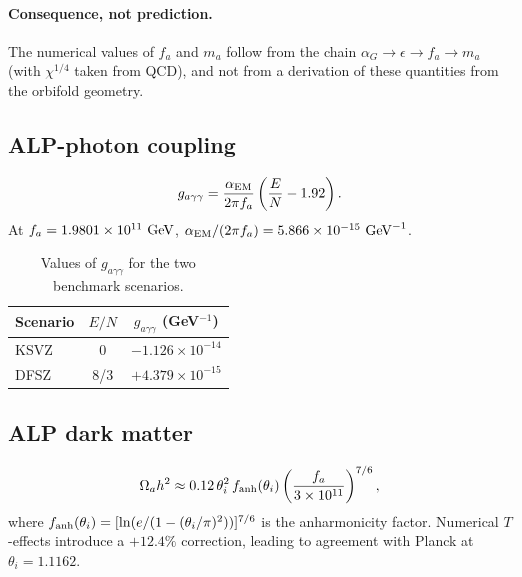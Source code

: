 \documentclass[12pt,a4paper]{article}
\numberwithin{equation}{section}
\begin{document}
\paragraph{Consequence, not prediction.}
The numerical values of \(f_a\) and \(m_a\) follow from the chain \(\alpha_G\to \epsilon \to f_a\to m_a\) (with \(\chi^{1/4}\) taken from QCD), and not from a derivation of these quantities from the orbifold geometry.

\subsection{ALP-photon coupling}
\begin{equation}
g_{a\gamma\gamma} = \frac{\alpha_{\rm EM}}{2\pi f_a}\left(\frac{E}{N} -1.92\right).
\end{equation}
At \(f_a = 1.9801\times 10^{11}~{\rm GeV}\), \(\alpha_{\rm EM}/(2\pi f_a) = 5.866\times 10^{-15}~{\rm GeV}^{-1}\).

\begin{table}[H]
\centering
\caption{Values of \(g_{a\gamma\gamma}\) for the two benchmark scenarios.}
\begin{tabular}{lcc}
\toprule
Scenario & \(E/N\) & \(g_{a\gamma\gamma}\) (GeV\(^{-1}\)) \\
\midrule
KSVZ & 0 & \(-1.126 \times 10^{-14}\) \\
DFSZ & 8/3 & \(+4.379 \times 10^{-15}\) \\
\bottomrule
\end{tabular}
\end{table}

\subsection{ALP dark matter}
\begin{equation}
\Omega_a h^2 \approx 0.12\,\theta_i^2\, f_{\rm anh}(\theta_i)\left(\frac{f_a}{3\times 10^{11}}\right)^{7/6},
\end{equation}
where \(f_{\rm anh}(\theta_i) = [\ln(e/(1-(\theta_i/\pi)^2))]^{7/6}\) is the anharmonicity factor. Numerical \(T\)-effects introduce a \(+12.4\%\) correction, leading to agreement with Planck at \(\theta_i = 1.1162\).
\end{document}
